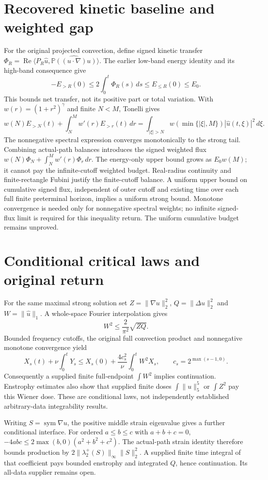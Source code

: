 \documentclass[11pt]{article}
\begin{document}
\section{Recovered kinetic baseline and weighted gap}
For the original projected convection, define signed kinetic transfer
$\Phi_R=\operatorname{Re}\langle P_R\widehat u,
\widehat{\mathbb P((u\cdot\nabla)u)}\rangle$.
The earlier low-band energy identity and its high-band consequence give
\[
-E_{>R}(0)\le 2\int_0^t\Phi_R(s)\,ds\le E_{\le R}(0)\le E_0.
\]
This bounds net transfer, not its positive part or total variation.
With $w(r)=(1+r^2)^\gamma$ and finite $N<M$, Tonelli gives
\[
w(N)E_{>N}(t)+\int_N^M w'(r)E_{>r}(t)\,dr
=\int_{|\xi|>N}w(\min\{|\xi|,M\})|\widehat u(t,\xi)|^2\,d\xi.
\]
The nonnegative spectral expression converges monotonically to the strong
tail. Combining actual-path balances introduces the signed weighted
flux $w(N)\Phi_N+\int_N^M w'(r)\Phi_r\,dr$. The energy-only upper bound
grows as $E_0w(M)$; it cannot pay the infinite-cutoff weighted budget.
Real-radius continuity and finite-rectangle Fubini justify the finite-cutoff
balance. A uniform upper bound on cumulative signed flux, independent of
outer cutoff and existing time over each full finite preterminal horizon,
implies a uniform strong bound. Monotone convergence is needed only for
nonnegative spectral weights; no infinite signed-flux limit is required
for this inequality return. The uniform cumulative budget remains unproved.

\section{Conditional critical laws and original return}
For the same maximal strong solution set
$Z=\|\nabla u\|_2^2$, $Q=\|\Delta u\|_2^2$ and
$W=\|\widehat u\|_1$. A whole-space Fourier interpolation gives
\[
 W^2\le \frac{2}{\pi^2}\sqrt{ZQ}.
\]
Bounded frequency cutoffs, the original full convection product and
nonnegative monotone convergence yield
\[
 X_s(t)+\nu\int_0^tY_s
 \le X_s(0)+\frac{4c_s^2}{\nu}\int_0^t W^2X_s,
 \qquad c_s=2^{\max(s-1,0)}.
\]
Consequently a supplied finite full-endpoint $\int W^2$ implies continuation.
Enstrophy estimates also show that supplied finite doses
$\int\|u\|_5^5$ or $\int Z^2$ pay this Wiener dose. These are conditional
laws, not independently established arbitrary-data integrability results.

Writing $S=\operatorname{sym}\nabla u$, the positive middle strain eigenvalue
gives a further conditional interface. For ordered $a\le b\le c$ with
$a+b+c=0$, $-4abc\le2\max(b,0)(a^2+b^2+c^2)$.
The actual-path strain identity therefore bounds production by
$2\|\lambda_2^+(S)\|_\infty\|S\|_2^2$. A supplied finite time integral
of that coefficient pays bounded enstrophy and integrated $Q$, hence
continuation. Its all-data supplier remains open.
\end{document}
